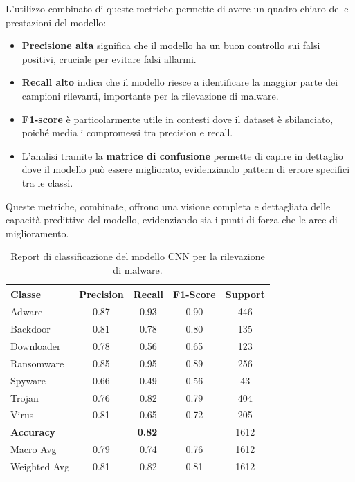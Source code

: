 L'utilizzo combinato di queste metriche permette di avere un quadro chiaro delle prestazioni del modello:
\begin{itemize}
    \item \textbf{Precisione alta} significa che il modello ha un buon controllo sui falsi positivi, cruciale per evitare falsi allarmi.
    \item \textbf{Recall alto} indica che il modello riesce a identificare la maggior parte dei campioni rilevanti, importante per la rilevazione di malware.
    \item \textbf{F1-score} è particolarmente utile in contesti dove il dataset è sbilanciato, poiché media i compromessi tra precision e recall.
    \item L'analisi tramite la \textbf{matrice di confusione} permette di capire in dettaglio dove il modello può essere migliorato, evidenziando pattern di errore specifici tra le classi.
\end{itemize}
Queste metriche, combinate, offrono una visione completa e dettagliata delle capacità predittive del modello, evidenziando sia i punti di forza che le aree di miglioramento.


\begin{table}[ht]
\centering
\begin{tabular}{@{}|lcccc|@{}}
\toprule
\textbf{Classe}      & \textbf{Precision} & \textbf{Recall} & \textbf{F1-Score} & \textbf{Support} \\ \midrule
Adware          & 0.87               & 0.93            & 0.90              & 446              \\
Backdoor        & 0.81               & 0.78            & 0.80              & 135              \\
Downloader      & 0.78               & 0.56            & 0.65              & 123              \\
Ransomware      & 0.85               & 0.95            & 0.89              & 256              \\
Spyware         & 0.66               & 0.49            & 0.56              & 43               \\
Trojan          & 0.76               & 0.82            & 0.79              & 404              \\
Virus           & 0.81               & 0.65            & 0.72              & 205              \\ \midrule
\textbf{Accuracy}      & \multicolumn{3}{c}{\textbf{0.82}}         & 1612             \\ \midrule
Macro Avg       & 0.79               & 0.74            & 0.76              & 1612             \\
Weighted Avg    & 0.81               & 0.82            & 0.81              & 1612             \\ \bottomrule
\end{tabular}
\vspace{.2cm}
\caption{Report di classificazione del modello CNN per la rilevazione di malware.}
\label{tab:classification_report}
\end{table}


